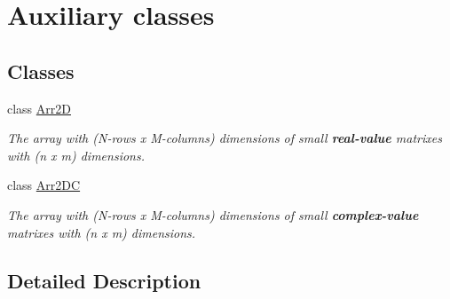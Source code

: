 \hypertarget{group___auxiliary__classes}{}\section{Auxiliary classes}
\label{group___auxiliary__classes}
\subsection*{Classes}
\begin{DoxyCompactItemize}
\item 
class \mbox{\hyperlink{class_arr2_d}{Arr2D}}
\begin{DoxyCompactList}\small\item\em The array with (N-\/rows x M-\/columns) dimensions of small {\bfseries real-\/value} matrixes with (n x m) dimensions. \end{DoxyCompactList}\item 
class \mbox{\hyperlink{class_arr2_d_c}{Arr2\+DC}}
\begin{DoxyCompactList}\small\item\em The array with (N-\/rows x M-\/columns) dimensions of small {\bfseries complex-\/value} matrixes with (n x m) dimensions. \end{DoxyCompactList}\end{DoxyCompactItemize}


\subsection{Detailed Description}
